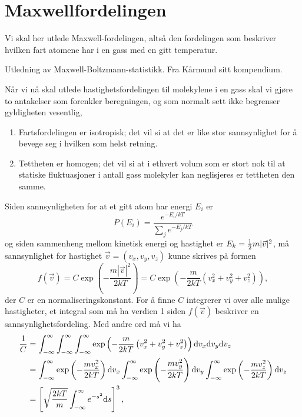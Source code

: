 \chapter{Maxwellfordelingen}
\label{apx:maxwellfordeling}
Vi skal her utlede Maxwell-fordelingen, altså den fordelingen som beskriver hvilken fart atomene har i en gass med en gitt temperatur. 

Utledning av Maxwell-Boltzmann-statistikk. Fra Kårmund sitt kompendium.

Når vi nå skal utlede hastighetsfordelingen til molekylene i en gass skal vi gjøre to antakelser som forenkler beregningen, og som normalt sett ikke begrenser gyldigheten vesentlig,
\begin{enumerate}
	\item
	Fartsfordelingen er isotropisk; det vil si at det er like stor sannsynlighet for å bevege seg i hvilken som helst retning.
	\item
 	Tettheten er homogen; det vil si at i ethvert volum som er stort nok til at statiske fluktuasjoner i antall gass molekyler kan neglisjeres er tettheten den samme.
\end{enumerate}
Siden sannsynligheten for at et gitt atom har energi $E_i$ er 
\begin{displaymath}
	P(E_i) = \frac{e^{-E_i/kT}}{\sum_j e^{-E_j/kT}}
\end{displaymath}
og siden sammenheng mellom kinetisk energi og hastighet er $E_k = \frac{1}{2} m|\vec{v}|^2$, må sannsynlighet for hastighet $\vec{v} = (v_x,v_y,v_z)$ kunne skrives på formen
\begin{displaymath}
	f(\vec{v}) = C\exp\left(-\frac{m|\vec{v}|^2}{2kT}\right) = C\exp\left(-\frac{m}{2kT}\left(v_x^2+v_y^2+v_z^2\right)\right),
\end{displaymath}
der $C$ er en normaliseringskonstant. For å finne $C$ integrerer vi over alle mulige hastigheter, et integral som må ha verdien 1 siden $f(\vec{v})$ beskriver en sannsynlighetsfordeling. Med andre ord må vi ha
\begin{displaymath}
\begin{aligned}
	\frac{1}{C} &= \int_{-\infty}^{\infty}\int_{-\infty}^{\infty}\int_{-\infty}^{\infty}\exp\left(-\frac{m}{2kT}\left(v_x^2+v_y^2+v_z^2\right)\right)\text{d} v_x \text{d} v_y \text{d} v_z \\
	&= \int_{-\infty}^{\infty}\exp\left(-\frac{mv_x^2}{2kT}\right)\text{d} v_x  \int_{-\infty}^{\infty}\exp\left(-\frac{mv_y^2}{2kT}\right)\text{d} v_y  \int_{-\infty}^{\infty}\exp\left(-\frac{mv_z^2}{2kT}\right)\text{d} v_z \\
	&= \left[ \sqrt{\frac{2kT}{m}}\int_{-\infty}^\infty e^{-s^2} \text{d} s\right]^3, 
\end{aligned}
\end{displaymath}
